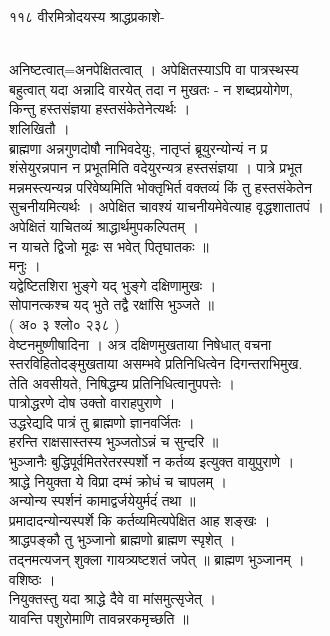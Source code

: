 \documentclass[11pt, openany]{book}
\begin{document}
{{११८ }{ वीरमित्रोदयस्य श्राद्धप्रकाशे-}{\\
अनिष्टत्वात्=अनपेक्षितत्वात् । अपेक्षितस्याऽपि वा पात्रस्थस्य\\
बहुत्वात् यदा अन्नादि वारयेत् तदा न मुखतः - न शब्दप्रयोगेण,\\
किन्तु हस्तसंज्ञया हस्तसंकेतेनेत्यर्थः ।\\
शलिखितौ ।\\
ब्राह्मणा अन्नगुणदोषौ नाभिवदेयुः, नातृप्तं ब्रूयुरन्योन्यं न प्र\\
शंसेयुरन्नपान न प्रभूतमिति वदेयुरन्यत्र हस्तसंज्ञया । पात्रे प्रभूत\\
मन्नमस्त्यन्यन्न परिवेष्यमिति भोक्तृभिर्त वक्तव्यं किं तु हस्तसंकेतेन\\
सुचनीयमित्यर्थः । अपेक्षित चावश्यं याचनीयमेवेत्याह वृद्धशातातपं ।\\
अपेक्षितं याचितव्यं श्राद्धार्थमुपकल्पितम् ।\\
न याचते द्विजो मूढः स भवेत् पितृघातकः ॥\\
मनुः ।\\
यद्वेष्टितशिरा भुङ्गे यद् भुङ्गे दक्षिणामुखः ।\\
सोपानत्कश्च यद् भुते तद्वै रक्षांसि भुञ्जते ॥\\
( अ० ३ श्लो० २३८ )\\
वेष्टनमुष्णीषादिना । अत्र दक्षिणमुखताया निषेधात् वचना\\
स्तरविहितोदङ्मुखताया असम्भवे प्रतिनिधित्वेन दिगन्तराभिमुख.\\
तेति अवसीयते, निषिद्धम्य प्रतिनिधित्वानुपपत्तेः ।\\
पात्रोद्धरणे दोष उक्तो वाराहपुराणे ।\\
उद्धरेद्यदि पात्रं तु ब्राह्मणो ज्ञानवर्जितः ।\\
हरन्ति राक्षसास्तस्य भुञ्जतोऽन्नं च सुन्दरि ॥\\
भुञ्जानैः बुद्धिपूर्वमितरेतरस्पर्शो न कर्तव्य इत्युक्त वायुपुराणे ।\\
श्राद्धे नियुक्ता ये विप्रा दम्भं क्रोधं च चापलम् ।\\
अन्योन्य स्पर्शनं कामाद्वर्जयेयुर्मदंं तथा ॥\\
प्रमादादन्योन्यस्पर्शे कि कर्तव्यमित्यपेक्षित आह शङ्खः ।\\
श्राद्धपङ्कौ तु भुञ्जानो ब्राह्मणो ब्राह्मण स्पृशेत् ।\\
तद्नमत्यजन् शुक्ला गायत्र्यष्टशतं जपेत् ॥ ब्राह्मण भुञ्जानम् ।\\
वशिष्ठः ।\\
नियुक्तस्तु यदा श्राद्धे दैवे वा मांसमुत्सृजेत् ।\\
यावन्ति पशुरोमाणि तावन्नरकमृच्छति ॥

}}
\end{document}
